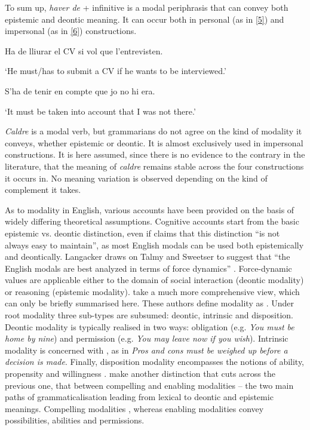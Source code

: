 \documentclass[output=paper,english,spanish,german,english]{langsci/langscibook}
\begin{document}
\noindent To sum up, \textit{haver de} + infinitive is a modal periphrasis that can convey both epistemic and deontic meaning. It can occur both in personal (as in \ref{5}) and impersonal (as in \ref{6}) constructions.

\begin{exe}
  \ex Ha de lliurar el CV si vol que l’entrevisten.\label{5}

  `He must\slash has to submit a CV if he wants to be interviewed.'

  \ex S’ha de tenir en compte que jo no hi era.\label{6}

  `It must be taken into account that I was not there.'
\end{exe}

\noindent \textit{Caldre} is a modal verb, but grammarians do not agree on the kind of modality it conveys, whether epistemic or deontic. It is almost exclusively used in impersonal constructions. It is here assumed, since there is no evidence to the contrary in the literature, that the meaning of \textit{caldre} remains stable across the four constructions it occurs in. No meaning variation is observed depending on the kind of complement it takes.

As to modality in English, various accounts have been provided on the basis of widely differing theoretical assumptions. Cognitive accounts start from the basic epistemic vs. deontic distinction, even if \citet[272]{langacker91} claims that this distinction \enquote{is not always easy to maintain}, as most English modals can be used both epistemically and deontically. Langacker draws on Talmy and Sweetser to suggest that \enquote{the English modals are best analyzed in terms of force dynamics} \parencite*[273]{langacker91}. Force-dynamic values are applicable either to the domain of social interaction (deontic modality) or reasoning (epistemic modality). \citet{raddir07} take a much more comprehensive view, which can only be briefly summarised here. These authors define modality as . Under root modality three sub-types are subsumed: deontic, intrinsic and disposition. Deontic modality is typically realised in two ways: obligation (e.g. \textit{You must be home by nine}) and permission (e.g. \textit{You may leave now if you wish}). Intrinsic modality is concerned with , as in \textit{Pros and cons must be weighed up before a decision is made}. Finally, disposition modality encompasses the notions of ability, propensity and willingness \parencite*[246]{raddir07}. \citet{raddir07} make another distinction that cuts across the previous one, that between compelling and enabling modalities -- the two main paths of grammaticalisation leading from lexical to deontic and epistemic meanings. Compelling modalities , whereas enabling modalities convey possibilities, abilities and permissions.
\end{document}
